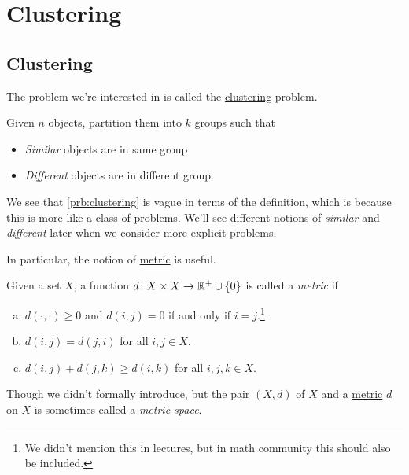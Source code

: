 \chapter{Clustering}

\section{Clustering}

The problem we're interested in is called the \hyperref[prb:clustering]{clustering} problem.

\begin{problem}[Clustering]\label{prb:clustering}
Given \(n\) objects, partition them into \(k\) groups such that
\begin{itemize}
	\item \emph{Similar} objects are in same group
	\item \emph{Different} objects are in different group.
\end{itemize}
\end{problem}

\begin{note}
	We see that \autoref{prb:clustering} is vague in terms of the definition, which is because this is more like a class of problems. We'll see different notions of \emph{similar} and \emph{different} later when we consider more explicit problems.
\end{note}

In particular, the notion of \hyperref[def:metric]{metric} is useful.

\begin{definition}[Metric]\label{def:metric}
	Given a set \(X\), a function \(d\colon X\times X\to \mathbb{\MakeUppercase{r}} ^+ \cup \left\{ 0 \right\} \) is called a \emph{metric} if
	\begin{enumerate}[(a)]
		\item \(d(\cdot, \cdot) \geq 0\) and \(d(i, j) = 0\) if and only if \(i = j\).\footnote{We didn't mention this in lectures, but in math community this should also be included.}
		\item \(d(i, j) = d(j, i)\) for all \(i, j\in X\).
		\item \(d(i, j) + d(j, k) \geq d(i, k)\) for all \(i, j, k\in X\).
	\end{enumerate}
\end{definition}

\begin{remark}\label{rmk:metric-space}
	Though we didn't formally introduce, but the pair \((X, d)\) of \(X\) and a \hyperref[def:metric]{metric} \(d\) on \(X\) is sometimes called a \emph{metric space}.
\end{remark}

